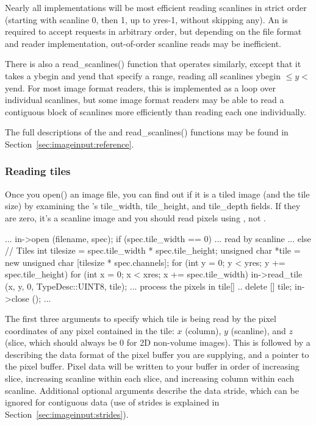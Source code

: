 Nearly all \ImageInput implementations will be most efficient reading
scanlines in strict order (starting with scanline 0, then 1, up to {\kw
  yres-1}, without skipping any).  An \ImageInput is required to accept
\readscanline requests in arbitrary order, but depending on the file
format and reader implementation, out-of-order scanline reads may be
inefficient.

There is also a {\cf read_scanlines()} function that operates similarly,
except that it takes a {\cf ybegin} and {\cf yend} that specify a range,
reading all scanlines {\cf ybegin} $\le y <$ {\cf yend}.  For most image
format readers, this is implemented as a loop over individual scanlines,
but some image format readers may be able to read a contiguous block of
scanlines more efficiently than reading each one individually.

The full descriptions of the \readscanline and {\cf read_scanlines()}
functions may be found in Section~\ref{sec:imageinput:reference}.

\subsubsection{Reading tiles}

Once you {\kw open()} an image file, you can find out if it is a tiled
image (and the tile size) by examining the \ImageSpec's {\cf
  tile_width}, {\cf tile_height}, and {\cf tile_depth} fields.
If they are zero, it's a scanline image and you should read pixels
using \readscanline, not \readtile.

\begin{code}
        ...
        in->open (filename, spec);
        if (spec.tile_width == 0) {
            ... read by scanline ...
        } else {
            // Tiles
            int tilesize = spec.tile_width * spec.tile_height;
            unsigned char *tile = new unsigned char [tilesize * spec.channels];
            for (int y = 0;  y < yres;  y += spec.tile_height) {
                for (int x = 0;  x < xres;  x += spec.tile_width) {
                    in->read_tile (x, y, 0, TypeDesc::UINT8, tile);
                    ... process the pixels in tile[] ..
                }
            }
            delete [] tile;
        }
        in->close ();
        ...
\end{code}

The first three arguments to \readtile specify which tile is
being read by the pixel coordinates of any pixel contained in the
tile: $x$ (column), $y$ (scanline), and $z$ (slice, which should always
be 0 for 2D non-volume images).  This is followed by a \TypeDesc
describing the data format of the pixel buffer you are supplying, and a
pointer to the pixel buffer.  Pixel data will be written to your buffer
in order of increasing slice, increasing
scanline within each slice, and increasing column within each scanline.
Additional optional arguments describe the data stride, which can be
ignored for contiguous data (use of strides is explained in
Section~\ref{sec:imageinput:strides}).

